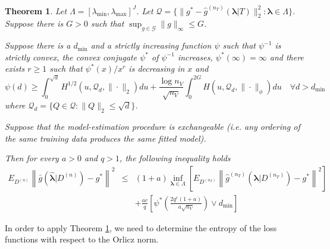 \documentclass[12pt]{article}
\newtheorem{theorem}{Theorem}
\begin{document}
\begin{theorem}
	\label{thrm:mitchell}
	Let $\Lambda = [\lambda_{\min}, \lambda_{\max}]^J$. Let
	$\mathcal{Q} = \{ \| g^* - \hat{g}^{(n_T)}(\boldsymbol{\lambda}|T) \|_2^2 : \boldsymbol{\lambda} \in \Lambda \}$.
	Suppose there is $G > 0$ such that $\sup_{g \in \mathcal{G}} \| g \|_\infty \le G$.
	
	Suppose there is a $d_{\min}$ and a strictly increasing function $\psi$ such that $\psi^{-1}$ is strictly convex, the convex conjugate $\psi^*$ of $\psi^{-1}$ increases, $\psi^*(\infty ) = \infty$ and there exists $r \ge1$ such that $\psi^*(x)/x^r$ is decreasing in $x$ and
	\begin{equation}
	\label{eq:mitchell_dudley_bound}
	\psi(d) \ge \int_0^{\sqrt{d}} H^{1/2}(u, \mathcal{Q}_d, \| \cdot \|_2) du +
	\frac{\log n_V}{\sqrt{n_V}} \int_0^{2G} H(u, \mathcal{Q}_d, \| \cdot \|_\phi) du
	\quad
	\forall d > d_{\min}
	\end{equation}
	where $ \mathcal{Q}_d = \{ Q \in \mathcal{Q}: \| Q \|_2 \le \sqrt{d} \}$.
	
	Suppose that the model-estimation procedure is exchangeable (i.e. any ordering of the same training data produces the same fitted model).
	
	Then for every $a > 0$ and $q > 1$, the following inequality holds
	\begin{eqnarray}
	E_{D^{(n)}} \left \| \bar{g} ( \hat{\boldsymbol \lambda} | {D^{(n)}} ) - g^* \right \|^2 &\le&
	(1+a) \inf_{\boldsymbol{\lambda} \in \Lambda} \left [
	E_{D^{(n_T)}} \left \| \hat{g}^{(n_T)}(\boldsymbol \lambda | D^{(n_T)}) - g^* \right \|^2  
	\right ] \\
	&& + \frac{ac}{q}\left [
	\psi^* \left (\frac{2q^{r}(1+a)}{a\sqrt{n_V}} \right ) \vee d_{\min}
	\right ]
	\end{eqnarray}
\end{theorem}

In order to apply Theorem \ref{thrm:mitchell}, we need to determine the entropy of the loss functions with respect to the Orlicz norm.
\end{document}
